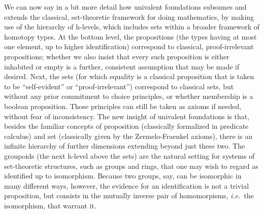 \documentclass[11pt]{article}
\theoremstyle{remark}
\theoremstyle{definition}
\begin{document}
We can now say in a bit more detail how univalent foundations subsumes and extends the classical, set-theoretic
framework for doing mathematics, by making use of the hierarchy of h-levels, which includes sets within a broader
framework of homotopy types.  At the bottom level, the propositions (the types having at most one element, up to higher
identification) correspond to classical, proof-irrelevant propositions; whether we also insist that every such
proposition is either inhabited or empty is a further, consistent assumption that may be made if desired.  Next, the
sets (for which equality is a classical proposition that is taken to be ``self-evident'' or ``proof-irrelevant'')
correspond to classical sets, but without any prior commitment to choice principles, or whether membership is a boolean
proposition.  Those principles can still be taken as axioms if needed, without fear of inconsistency.  The new insight
of univalent foundations is that, besides the familiar concepts of proposition (classically formalized in predicate
calculus) and set (classically given by the Zermelo-Fraenkel axioms), there is an infinite hierarchy of further
dimensions extending beyond just these two.  The groupoids (the next h-level above the sets) are the natural setting for
systems of set-theoretic structures, such as groups and rings, that one may wish to regard as identified up to
isomorphism.  Because two groups, say, can be isomorphic in many different ways, however, the evidence for an
identification is not a trivial proposition, but consists in the mutually inverse pair of homomorpisms, \textit{i.e.}\ the
isomorphism, that warrant it.
\end{document}
